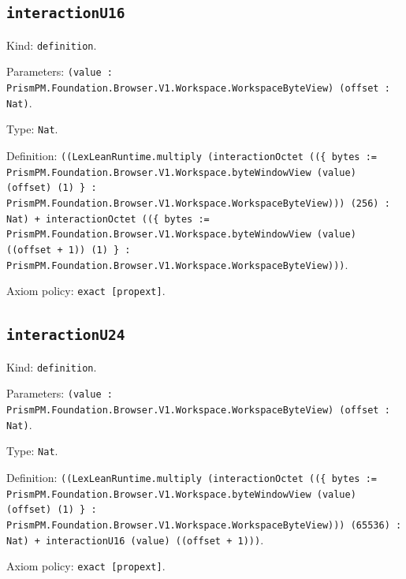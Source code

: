 \documentclass[11pt]{article}
\begin{document}
\subsection*{\texttt{interactionU16}}
\noindent Kind: \texttt{definition}.\par
\noindent Parameters: \texttt{(value : PrismPM.Foundation.Browser.V1.Workspace.WorkspaceByteView) (offset : Nat)}.\par
\noindent Type: \texttt{Nat}.\par
\noindent Definition: \texttt{((LexLeanRuntime.multiply (interactionOctet ((\{ bytes := PrismPM.Foundation.Browser.V1.Workspace.byteWindowView (value) (offset) (1) \} : PrismPM.Foundation.Browser.V1.Workspace.WorkspaceByteView))) (256) : Nat) + interactionOctet ((\{ bytes := PrismPM.Foundation.Browser.V1.Workspace.byteWindowView (value) ((offset + 1)) (1) \} : PrismPM.Foundation.Browser.V1.Workspace.WorkspaceByteView)))}.\par
\noindent Axiom policy: \texttt{exact [propext]}.\par
\subsection*{\texttt{interactionU24}}
\noindent Kind: \texttt{definition}.\par
\noindent Parameters: \texttt{(value : PrismPM.Foundation.Browser.V1.Workspace.WorkspaceByteView) (offset : Nat)}.\par
\noindent Type: \texttt{Nat}.\par
\noindent Definition: \texttt{((LexLeanRuntime.multiply (interactionOctet ((\{ bytes := PrismPM.Foundation.Browser.V1.Workspace.byteWindowView (value) (offset) (1) \} : PrismPM.Foundation.Browser.V1.Workspace.WorkspaceByteView))) (65536) : Nat) + interactionU16 (value) ((offset + 1)))}.\par
\noindent Axiom policy: \texttt{exact [propext]}.\par
\end{document}
